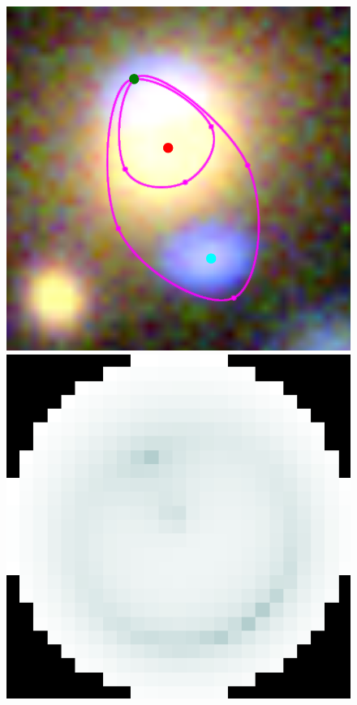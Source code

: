 \begin{figure}
  \centering

  \includegraphics[width=\myplotswidth]{fig/006937_input}
  \includegraphics[width=\myplotswidth]{fig/006937_arr_time} \\

\end{figure}
